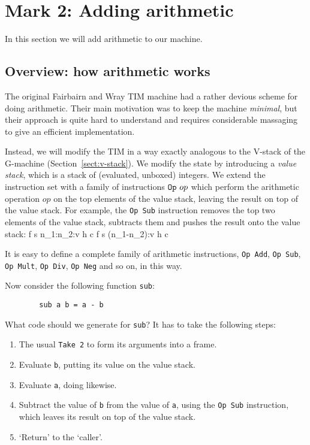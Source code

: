 \section{Mark 2: Adding arithmetic}

In this section we will add arithmetic
to our machine.

\subsection{Overview: how arithmetic works}
\label{sect:tim:arith-overview}

The original Fairbairn and Wray TIM machine had a rather devious scheme
for doing arithmetic.  Their main motivation was to keep the machine
{\em minimal}, but their approach is quite hard to understand
and requires considerable massaging to give an efficient implementation.

Instead, we will modify the TIM in a way exactly analogous to the
V-stack
of the G-machine (Section~\ref{sect:v-stack}).
We modify the state by introducing a {\em value stack},
which is a stack of (evaluated, unboxed) integers.
We extend the instruction set with a family of instructions $\mbox{\tt Op}~op$ which
perform the arithmetic operation $op$
on the top elements of the value stack, leaving the
result on top of the value stack.
For example, the \mbox{\tt Op\ Sub} instruction removes the top two elements of the
value stack, subtracts them and pushes the result onto the value stack:
\timruleV
{ {f} {s} {n_1:n_2:v} {h} {c}}
{       {f} {s} {(n_1-n_2):v} {h} {c}}

It is easy to define a complete family of arithmetic instructions,
\mbox{\tt Op\ Add}, \mbox{\tt Op\ Sub}, \mbox{\tt Op\ Mult}, \mbox{\tt Op\ Div}, \mbox{\tt Op\ Neg} and so on,
in this way.

Now consider the following function \mbox{\tt sub}:
\begin{verbatim}
        sub a b = a - b
\end{verbatim}
What code should we generate for \mbox{\tt sub}?
It has to take the following steps:
\begin{enumerate}
\item
The usual \mbox{\tt Take\ 2} to form its arguments into a frame.
\item
Evaluate \mbox{\tt b}, putting its value on the value stack.
\item
Evaluate \mbox{\tt a}, doing likewise.
\item
Subtract the value of \mbox{\tt b} from the value of \mbox{\tt a}, using the \mbox{\tt Op\ Sub} instruction,
which leaves its result on top of the value stack.
\item
`Return' to the `caller'.
\end{enumerate}

